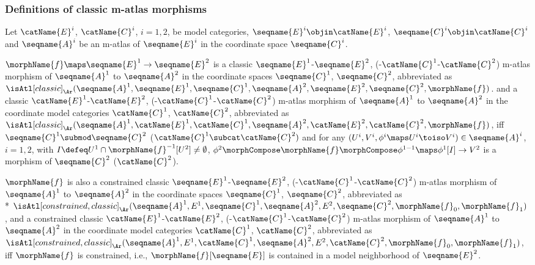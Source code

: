 \documentclass{article}
\begin{document}
\subsubsection{Definitions of classic m-atlas morphisms}
\begin{definition}
\label{def:M-ATLcmorph}
Let $\catName{E}^i$, $\catName{C}^i$, $i=1,2$, be model categories,
$\seqname{E}^i \objin \catName{E}^i$,
$\seqname{C}^i \objin \catName{C}^i$
and $\seqname{A}^i$ be an m-atlas
of $\seqname{E}^i$ in the coordinate space $\seqname{C}^i$.

$\morphName{f} \maps \seqname{E}^1 \to \seqname{E}^2$ is a classic
\nobreaks
  {
    {$\seqname{E}^1$-$\seqname{E}^2$},
    {(-$\catName{C}^1$-$\catName{C}^2$)}
  }
m-atlas morphism of $\seqname{A}^1$ to $\seqname{A}^2$ in the coordinate
spaces $\seqname{C}^1$, $\seqname{C}^2$, abbreviated as
$
  \isAtl[classic]_\Ar
  (
    \seqname{A}^1,
    \seqname{E}^1,
    \seqname{C}^1,
    \seqname{A}^2,
    \seqname{E}^2,
    \seqname{C}^2,
    \morphName{f}
  )
$.
and a classic
\nobreaks
 {
   {$\catName{E}^1$-$\catName{E}^2$},
   {(-$\catName{C}^1$-$\catName{C}^2$)}
  }
m-atlas morphism of $\seqname{A}^1$ to $\seqname{A}^2$ in the coordinate
model categories $\catName{C}^1$, $\catName{C}^2$, abbreviated as
$
  \isAtl[classic]_\Ar
  (
    \seqname{A}^1,
    \catName{E}^1,
    \catName{C}^1,
    \seqname{A}^2,
    \catName{E}^2,
    \catName{C}^2,
    \morphName{f}
  )
$,
iff
\nobreaks
  {{
    $\seqname{C}^1 \submod \seqname{C}^2$
  }}
($\catName{C}^1 \subcat \catName{C}^2)$
and for any $(U^i, V^i, \phi^i \maps U^i \toiso V^i) \in \seqname{A}^i$,
$i=1,2$, with $I \defeq U^1 \cap \morphName{f}^{-1}[U^2] \neq \emptyset$,
$
  \phi^2 \morphCompose \morphName{f} \morphCompose \phi^{1-1} \maps
    \phi^1[I] \to V^2
$
is a morphism of $\seqname{C}^2$ ($\catName{C}^2$).

$\morphName{f}$ is also a constrained classic
\nobreaks
  {
    {$\seqname{E}^1$-$\seqname{E}^2$},
    {(-$\catName{C}^1$-$\catName{C}^2$)}
  }
m-atlas
morphism of $\seqname{A}^1$ to $\seqname{A}^2$ in the coordinate spaces
$\seqname{C}^1$, $\seqname{C}^2$, abbreviated as \\*
$
  \isAtl[constrained,classic]_\Ar
    (
      \seqname{A}^1,
      E^1,
      \seqname{C}^1,
      \seqname{A}^2,
      E^2,
      \seqname{C}^2,
      \morphName{f}_0,
      \morphName{f}_1
    )
$,
and a constrained classic
\nobreaks
  {
    {$\catName{E}^1$-$\catName{E}^2$},
    {(-$\catName{C}^1$-$\catName{C}^2$)}
  }
m-atlas morphism of
$\seqname{A}^1$ to $\seqname{A}^2$ in the coordinate model categories
$\catName{C}^1$, $\catName{C}^2$, abbreviated as
$
  \isAtl[constrained,classic]_\Ar
    (
      \seqname{A}^1,
      E^1,
      \catName{C}^1,
      \seqname{A}^2,
      E^2,
      \catName{C}^2,
      \morphName{f}_0,
      \morphName{f}_1
    )
$,
iff $\morphName{f}$ is constrained, i.e.,
$\morphName{f}[\seqname{E}]$ is contained in a model neighborhood of
$\seqname{E}^2$.


\end{definition}
\end{document}
